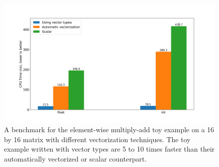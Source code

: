 \documentclass[logo,bsc,singlespacing,parskip]{infthesis}
\newcommand{\dtint}{\texttt{int32\char`_t}}
\newcommand{\dtfloat}{\texttt{float}}
\begin{document}
\begin{figure}[H]\captionsetup{name=Figure}
    \begin{center}
    \includegraphics[width=\linewidth]{image/plot_vectorization_method.png}
    \end{center}
    \caption{A benchmark for the element-wise multiply-add toy example on a 16
        by 16 matrix with different vectorization techniques. The toy example
        written with vector types are 5 to 10 times faster than their
        automatically vectorized or scalar counterpart. 
    }
    \label{plot_vectorization_method}
\end{figure}
\end{document}
